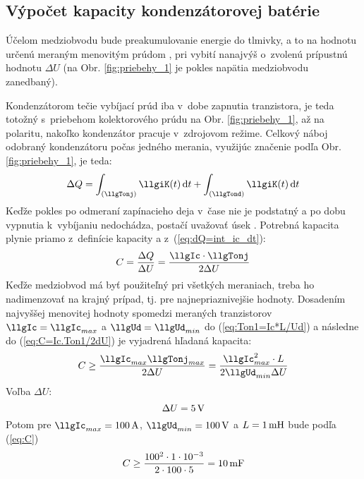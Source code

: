 \subsection{Výpočet kapacity kondenzátorovej batérie} \label{ssc:vypocet_kapacity}

Účelom medziobvodu bude preakumulovanie energie do tlmivky, a to na hodnotu určenú meraným menovitým prúdom \llgIc, pri vybití nanajvýš o~zvolenú prípustnú hodnotu $\Delta U$ (na Obr. \ref{fig:priebehy_1} je pokles napätia medziobvodu zanedbaný). 

Kondenzátorom tečie vybíjací prúd iba v~dobe zapnutia tranzistora, je teda totožný s~priebehom kolektorového prúdu na Obr. \ref{fig:priebehy_1}, až na polaritu, nakoľko kondenzátor pracuje v~zdrojovom režime. Celkový náboj odobraný kondenzátoru počas jedného merania, využijúc značenie podľa Obr. \ref{fig:priebehy_1}, je teda:
\begin{equation}
	\Delta Q = \int_{(\llgTonj)} \llgiK(t) \dif t +  \int_{(\llgTond)} \llgiK(t) \dif t
	\label{eq:dQ=int_ic_dt}
\end{equation}
Keďže pokles po odmeraní zapínacieho deja v~čase \llgtj nie je podstatný a po dobu vypnutia \llgToffj k~vybíjaniu nedochádza, postačí uvažovať úsek \llgTonj. Potrebná kapacita plynie priamo z~definície kapacity a z~(\ref{eq:dQ=int_ic_dt}):
\begin{equation}
	C = \frac{\Delta Q}{\Delta U} = \frac{\llgIc \cdot \llgTonj}{2 \Delta U}
	\label{eq:C=Ic.Ton1/2dU}
\end{equation}
Keďže medziobvod má byť použiteľný pri všetkých meraniach, treba ho nadimenzovať na krajný prípad, tj. pre najnepriaznivejšie hodnoty. Dosadením najvyššej menovitej hodnoty spomedzi meraných tranzistorov $\llgIc = \llgIc_{max}$ a $\llgUd = \llgUd_{min}$ do (\ref{eq:Ton1=Ic*L/Ud}) a následne do (\ref{eq:C=Ic.Ton1/2dU}) je vyjadrená hľadaná kapacita:
\begin{equation}
	C \geq \frac{\llgIc_{max}\llgTonj_{max}}{2 \Delta U} = \frac{\llgIc_{max}^2 \cdot L}{2 \llgUd_{min}\Delta U}
	\label{eq:C}
\end{equation}
Voľba $\Delta U$:
\begin{equation}
	\Delta U = 5 \, \mathrm{V}
	\label{eq:delta_U_volba}
\end{equation}
Potom pre $\llgIc_{max} = 100 \un{A}$, $\llgUd_{min} = 100 \un{V}$ a $L=1\, \mathrm{mH}$ bude podľa (\ref{eq:C})
\begin{equation}
	C \geq \frac{100^2 \cdot 1\cdot 10^{-3}}{2 \cdot 100 \cdot 5} = 10 \, \mathrm{mF}
	\label{eq:C_vypocet}
\end{equation}

